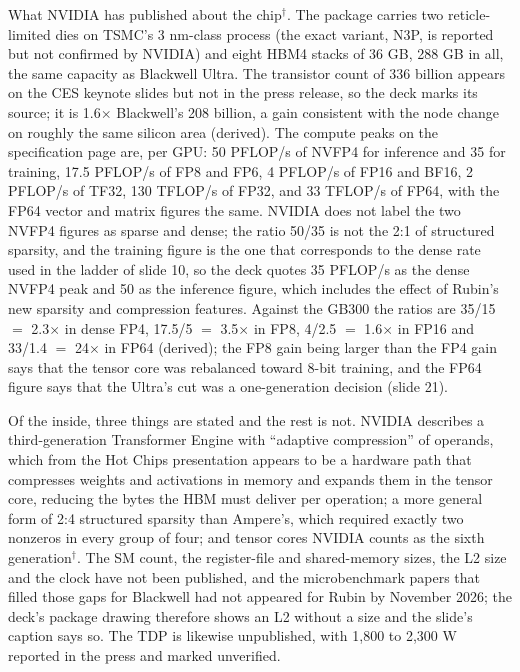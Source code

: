 \documentclass[11pt,letterpaper]{article}
\begin{document}
What NVIDIA has published about the chip$^\dagger$. The package carries two reticle-limited dies on TSMC's 3 nm-class process (the exact variant, N3P, is reported but not confirmed by NVIDIA) and eight HBM4 stacks of 36 GB, 288 GB in all, the same capacity as Blackwell Ultra. The transistor count of 336 billion appears on the CES keynote slides but not in the press release, so the deck marks its source; it is 1.6$\times$ Blackwell's 208 billion, a gain consistent with the node change on roughly the same silicon area (derived). The compute peaks on the specification page are, per GPU: 50 PFLOP/s of NVFP4 for inference and 35 for training, 17.5 PFLOP/s of FP8 and FP6, 4 PFLOP/s of FP16 and BF16, 2 PFLOP/s of TF32, 130 TFLOP/s of FP32, and 33 TFLOP/s of FP64, with the FP64 vector and matrix figures the same. NVIDIA does not label the two NVFP4 figures as sparse and dense; the ratio 50/35 is not the 2:1 of structured sparsity, and the training figure is the one that corresponds to the dense rate used in the ladder of slide 10, so the deck quotes 35 PFLOP/s as the dense NVFP4 peak and 50 as the inference figure, which includes the effect of Rubin's new sparsity and compression features. Against the GB300 the ratios are 35/15 $=$ 2.3$\times$ in dense FP4, 17.5/5 $=$ 3.5$\times$ in FP8, 4/2.5 $=$ 1.6$\times$ in FP16 and 33/1.4 $=$ 24$\times$ in FP64 (derived); the FP8 gain being larger than the FP4 gain says that the tensor core was rebalanced toward 8-bit training, and the FP64 figure says that the Ultra's cut was a one-generation decision (slide 21).

Of the inside, three things are stated and the rest is not. NVIDIA describes a third-generation Transformer Engine with ``adaptive compression'' of operands, which from the Hot Chips presentation appears to be a hardware path that compresses weights and activations in memory and expands them in the tensor core, reducing the bytes the HBM must deliver per operation; a more general form of 2:4 structured sparsity than Ampere's, which required exactly two nonzeros in every group of four; and tensor cores NVIDIA counts as the sixth generation$^\dagger$. The SM count, the register-file and shared-memory sizes, the L2 size and the clock have not been published, and the microbenchmark papers that filled those gaps for Blackwell had not appeared for Rubin by November 2026; the deck's package drawing therefore shows an L2 without a size and the slide's caption says so. The TDP is likewise unpublished, with 1{,}800 to 2{,}300 W reported in the press and marked unverified.
\end{document}
